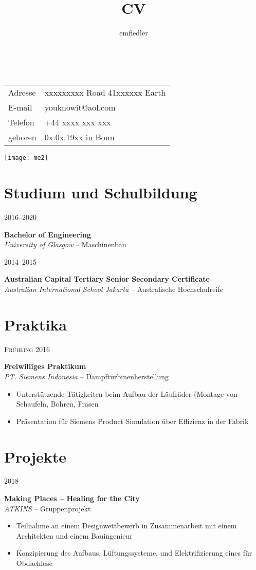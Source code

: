 \documentclass[a4paper]{article}
\title{CV}
\author{emfiedler}
\makeatletter
\renewcommand{\maketitle}{
\begin{flushleft}
{\Huge
\theauthor}\\
\vspace{3mm}
\hspace{3mm} 
\begingroup
\renewcommand{\arraystretch}{1.2}
\begin{tabular}{@{} p{15mm} p{50mm}}
	Adresse	&xxxxxxxxx Road 41\newline xxxxxx Earth\\
	E-mail 	&youknowit@aol.com\\
	Telefon	&+44 xxxx xxx xxx\\
	geboren	&0x.0x.19xx in Bonn
\end{tabular}
\endgroup

\end{flushleft}
}
\newcommand{\entry}[4]{

	\begin{minipage}[t]{.20\textwidth}
		\hfill \textsc{#1}

	\end{minipage}
	\hfill\vline\hfill
	\begin{minipage}[t]{.75\textwidth}
		\textbf{#2}\\ 
		\textit{#3}    
		#4

	\end{minipage} 
	\vspace{.25cm}

}
\makeatother
\begin{document}

\begin{minipage}{0.73\textwidth}
\maketitle
\end{minipage}
\begin{minipage}{0.25\textwidth}
	\hspace{2mm} 
	\vspace{-2mm} 
	\texttt{[image: me2]}
\end{minipage}

\section{Studium und Schulbildung}

\entry{2016--2020}{Bachelor of Engineering}{University of Glasgow}{-- Maschinenbau}

\entry{2014--2015}{Australian Capital Tertiary Senior Secondary Certificate}{Australian International School Jakarta}{-- Australische Hochschulreife}

\section{Praktika}

\entry{Fr{\"u}hling 2016}{Freiwilliges Praktikum}{PT. Siemens Indonesia}{-- Dampfturbinenherstellung\vspace{-.25cm} 
	\begin{itemize}[leftmargin=*]
		\setlength{\itemsep}{-3pt}
		\item Unterst{\"u}tzende T{\"a}tigkeiten beim Aufbau der L{\"a}ufr{\"a}der \newline \phantom{W}(Montage von Schaufeln, Bohren, Fr{\"a}sen
		\item Pr{\"a}sentation f{\"u}r Siemens Product Simulation {\"u}ber Effizienz in der Fabrik
	\end{itemize}	
}

\section{Projekte}

\entry{2018}{Making Places -- Healing for the City}{ATKINS}{-- Gruppenprojekt
\vspace{-.25cm} 
	\begin{itemize}[leftmargin=*]
		\setlength{\itemsep}{-3pt}
	\item Teilnahme an einem Designwettbewerb in Zusammenarbeit mit einem \newline\phantom{W}Architekten und einem Bauingenieur 
	\item Konzipierung des Aufbaus, L{\"u}ftungssysteme, und Elektrifizierung \newline\phantom{W}eines \glqq{Container-Home\grqq} f{\"u}r Obdachlose
	\end{itemize}
}
\end{document}
